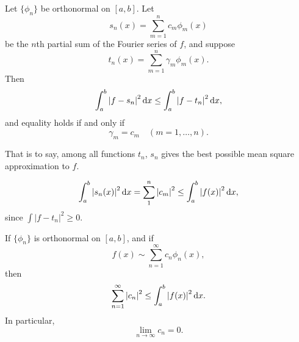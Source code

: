 \begin{thm}
    \label{thm:8.11}
    Let $\{\phi_n\}$ be orthonormal on $[a,b]$. 
    Let 
    \begin{equation}
        \label{eq:8.68}
        s_n(x) = \sum_{m=1}^{n} c_m \phi_m (x)
    \end{equation}
    be the $n$th partial sum of the Fourier series of $f$, and suppose 
    \begin{equation}
        \label{eq:8.69}
        t_n(x) = \sum_{m=1}^{n} \gamma_m \phi_m (x).
    \end{equation}
    Then 
    \begin{equation}
        \label{eq:8.70}
        \int_{a}^{b} \left| f-s_n \right|^2 \d x \leq
        \int_{a}^{b} \left| f-t_n \right|^2 \d x ,
    \end{equation}
    and equality holds if and only if 
    \begin{equation}
        \label{eq:8.71}
        \gamma_m = c_m 
        \quad 
        (m=1,\dots,n).
    \end{equation}
\end{thm}

That is to say, among all functions $t_n$, $s_n$ gives the best possible mean square approximation to $f$.


\begin{equation}
    \label{eq:8.72}
    \int_{a}^{b} \left| s_n(x) \right|^2 \d x = 
    \sum_{1}^{n} \left| c_m \right|^2 \leq
    \int_{a}^{b} \left| f(x) \right|^2 \d x ,
\end{equation}
since $\int \left| f-t_n \right|^2 \geq 0$.


\begin{thm}
    \label{thm:8.12}
    If $\{\phi_n\}$ is orthonormal on $[a,b]$, and if 
    \begin{equation*}
        f(x) \sim \sum_{n=1}^{\infty} c_n \phi_n (x),
    \end{equation*}
    then 
    \begin{equation}
        \label{eq:8.73}
        \sum_{n=1}^{\infty} \left| c_n \right|^2 \leq 
        \int_{a}^{b} \left| f(x) \right|^2 \d x .
    \end{equation}
    In particular, 
    \begin{equation}
        \label{eq:8.74}
        \lim_{n \to \infty} c_n = 0 .
    \end{equation}
\end{thm}

